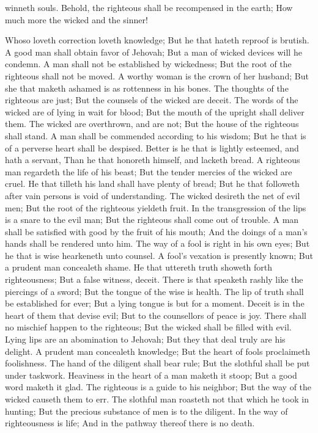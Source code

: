 winneth souls.  Behold, the righteous shall be recompensed in the earth; How much more the wicked and the sinner! 

Whoso loveth correction loveth knowledge; But he that hateth reproof is brutish.  A good man shall obtain favor of Jehovah; But a man of wicked devices will he condemn.  A man shall not be established by wickedness; But the root of the righteous shall not be moved.  A worthy woman is the crown of her husband; But she that maketh ashamed is as rottenness in his bones.  The thoughts of the righteous are just; But the counsels of the wicked are deceit.  The words of the wicked are of lying in wait for blood; But the mouth of the upright shall deliver them.  The wicked are overthrown, and are not; But the house of the righteous shall stand.  A man shall be commended according to his wisdom; But he that is of a perverse heart shall be despised.  Better is he that is lightly esteemed, and hath a servant, Than he that honoreth himself, and lacketh bread.  A righteous man regardeth the life of his beast; But the tender mercies of the wicked are cruel.  He that tilleth his land shall have plenty of bread; But he that followeth after vain persons is void of understanding.  The wicked desireth the net of evil men; But the root of the righteous yieldeth fruit.  In the transgression of the lips is a snare to the evil man; But the righteous shall come out of trouble.  A man shall be satisfied with good by the fruit of his mouth; And the doings of a man’s hands shall be rendered unto him.  The way of a fool is right in his own eyes; But he that is wise hearkeneth unto counsel.  A fool’s vexation is presently known; But a prudent man concealeth shame.  He that uttereth truth showeth forth righteousness; But a false witness, deceit.  There is that speaketh rashly like the piercings of a sword; But the tongue of the wise is health.  The lip of truth shall be established for ever; But a lying tongue is but for a moment.  Deceit is in the heart of them that devise evil; But to the counsellors of peace is joy.  There shall no mischief happen to the righteous; But the wicked shall be filled with evil.  Lying lips are an abomination to Jehovah; But they that deal truly are his delight.  A prudent man concealeth knowledge; But the heart of fools proclaimeth foolishness.  The hand of the diligent shall bear rule; But the slothful shall be put under taskwork.  Heaviness in the heart of a man maketh it stoop; But a good word maketh it glad.  The righteous is a guide to his neighbor; But the way of the wicked causeth them to err.  The slothful man roasteth not that which he took in hunting; But the precious substance of men is to the diligent.  In the way of righteousness is life; And in the pathway thereof there is no death. 

